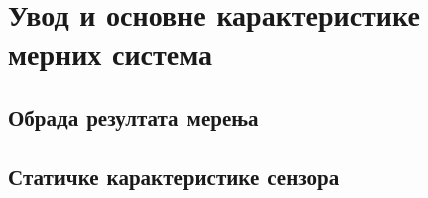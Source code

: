\section{Увод и основне карактеристике мерних система}
\subsection{Обрада резултата мерења}


\setcounter{fid}{0}
\graphicspath{{./1_uvod/0_orm/}}
\noindent

\vspace*{\ProblemSep}
\goodbreak


\setcounter{fid}{0}
\graphicspath{{./1_uvod/0_orm/}}
\noindent

\vspace*{\ProblemSep}
\goodbreak


\setcounter{fid}{0}
\graphicspath{{./1_uvod/0_orm/}}
\noindent

\vspace*{\ProblemSep}
\goodbreak


\setcounter{fid}{0}
\graphicspath{{./1_uvod/0_orm/}}
\noindent

\vspace*{\ProblemSep}
\goodbreak


\setcounter{fid}{0}
\graphicspath{{./1_uvod/0_orm/}}
\noindent

\vspace*{\ProblemSep}
\goodbreak


\setcounter{fid}{0}
\graphicspath{{./1_uvod/0_orm/}}
\noindent

\vspace*{\ProblemSep}
\goodbreak


\setcounter{fid}{0}
\graphicspath{{./1_uvod/0_orm/}}
\noindent

\vspace*{\ProblemSep}
\goodbreak
\subsection{Статичке карактеристике сензора}


\setcounter{fid}{0}
\graphicspath{{./1_uvod/1_stat/}}
\noindent

\vspace*{\ProblemSep}
\goodbreak


\setcounter{fid}{0}
\graphicspath{{./1_uvod/1_stat/}}
\noindent

\vspace*{\ProblemSep}
\goodbreak



